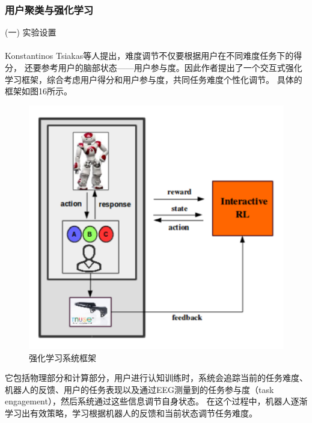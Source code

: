 \documentclass[12pt]{article}
\begin{document}
            \subsubsection{用户聚类与强化学习}
            (一) 实验设置\paragraph{}
            Konstantinos Tsiakas\cite{ref17}等人提出，难度调节不仅要根据用户在不同难度任务下的得分，
            还要参考用户的脑部状态——用户参与度。因此作者提出了一个交互式强化学习框架，综合考虑用户得分和用户参与度，共同任务难度个性化调节。
            具体的框架如图16所示。
            \begin{figure}[H]
            	
            	\centering
            	\includegraphics[scale=0.8]{images/RL_Frame.png}
            	\caption{强化学习系统框架}
            	\label{fig:label}
            \end{figure}
            它包括物理部分和计算部分，用户进行认知训练时，系统会追踪当前的任务难度、机器人的反馈、用户的任务表现以及通过EEG测量到的任务参与度（task engagement），然后系统通过这些信息调节自身状态。
            在这个过程中，机器人逐渐学习出有效策略，学习根据机器人的反馈和当前状态调节任务难度。
\end{document}
